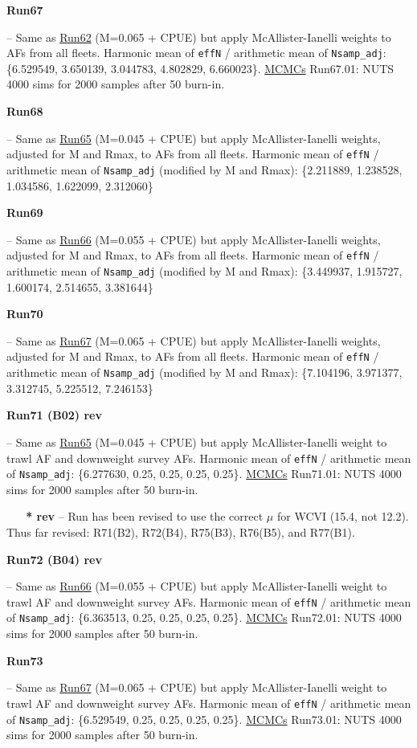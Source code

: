 \hypertarget{R67}{\textbf{Run67}} -- Same as \hyperlink{R62}{Run62} (M=0.065 + CPUE) but apply McAllister-Ianelli weights to AFs from all fleets.  Harmonic mean of \texttt{effN} / arithmetic mean of \texttt{Nsamp\_adj}: \{6.529549, 3.650139, 3.044783, 4.802829, 6.660023\}. \underline{MCMCs} Run67.01: NUTS 4000 sims for 2000 samples after 50\pc{} burn-in.

\hypertarget{R68}{\textbf{Run68}} -- Same as \hyperlink{R65}{Run65} (M=0.045 + CPUE) but apply McAllister-Ianelli weights, adjusted for M and Rmax, to AFs from all fleets.  Harmonic mean of \texttt{effN} / arithmetic mean of \texttt{Nsamp\_adj} (modified by M and Rmax): \{2.211889, 1.238528, 1.034586, 1.622099, 2.312060\}

\hypertarget{R69}{\textbf{Run69}} -- Same as \hyperlink{R66}{Run66} (M=0.055 + CPUE) but apply McAllister-Ianelli weights, adjusted for M and Rmax, to AFs from all fleets. Harmonic mean of \texttt{effN} / arithmetic mean of \texttt{Nsamp\_adj} (modified by M and Rmax): \{3.449937, 1.915727, 1.600174, 2.514655, 3.381644\}

\hypertarget{R70}{\textbf{Run70}} -- Same as \hyperlink{R67}{Run67} (M=0.065 + CPUE) but apply McAllister-Ianelli weights, adjusted for M and Rmax, to AFs from all fleets. Harmonic mean of \texttt{effN} / arithmetic mean of \texttt{Nsamp\_adj} (modified by M and Rmax): \{7.104196, 3.971377, 3.312745, 5.225512, 7.246153\}

\hypertarget{R71}{\textbf{Run71 (B02) rev}} -- Same as \hyperlink{R65}{Run65} (M=0.045 + CPUE) but apply McAllister-Ianelli weight to trawl AF and downweight survey AFs. Harmonic mean of \texttt{effN} / arithmetic mean of \texttt{Nsamp\_adj}: \{6.277630, 0.25, 0.25, 0.25, 0.25\}. \underline{MCMCs} Run71.01: NUTS 4000 sims for 2000 samples after 50\pc{} burn-in.

\textbf{~~~* rev} -- Run has been revised to use the correct $\mu$ for WCVI (15.4, not 12.2). Thus far revised: R71(B2), R72(B4), R75(B3), R76(B5), and R77(B1).

\hypertarget{R72}{\textbf{Run72 (B04) rev}} -- Same as \hyperlink{R66}{Run66} (M=0.055 + CPUE) but apply McAllister-Ianelli weight to trawl AF and downweight survey AFs. Harmonic mean of \texttt{effN} / arithmetic mean of \texttt{Nsamp\_adj}: \{6.363513, 0.25, 0.25, 0.25, 0.25\}. \underline{MCMCs} Run72.01: NUTS 4000 sims for 2000 samples after 50\pc{} burn-in.

\hypertarget{R73}{\textbf{Run73}} -- Same as \hyperlink{R67}{Run67} (M=0.065 + CPUE) but apply McAllister-Ianelli weight to trawl AF and downweight survey AFs. Harmonic mean of \texttt{effN} / arithmetic mean of \texttt{Nsamp\_adj}: \{6.529549, 0.25, 0.25, 0.25, 0.25\}. \underline{MCMCs} Run73.01: NUTS 4000 sims for 2000 samples after 50\pc{} burn-in.

